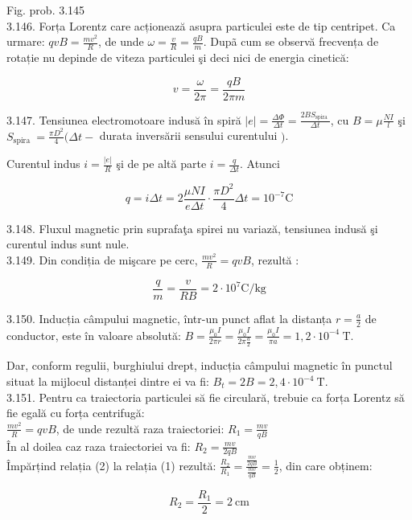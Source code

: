 \documentclass[10pt]{article}
\begin{document}
Fig. prob. 3.145\\
3.146. Forța Lorentz care acționează asupra particulei este de tip centripet. Ca urmare: $q v B=\frac{m v^{2}}{R}$, de unde $\omega=\frac{v}{R}=\frac{q B}{m}$. Dupã cum se observă frecvența de rotație nu depinde de viteza particulei şi deci nici de energia cinetică:

$$
v=\frac{\omega}{2 \pi}=\frac{q B}{2 \pi m}
$$

3.147. Tensiunea electromotoare indusă în spiră $|e|=\frac{\Delta \Phi}{\Delta t}=\frac{2 B S_{\text {spira }}}{\Delta t}$, cu $B=\mu \frac{N I}{l}$ şi $S_{\text {spira }}=\frac{\pi D^{2}}{4}(\Delta t-$ durata inversării sensului curentului $)$.

Curentul indus $i=\frac{|e|}{R}$ şi de pe altă parte $i=\frac{q}{\Delta t}$. Atunci

$$
q=i \Delta t=2 \frac{\mu N I}{e \Delta t} \cdot \frac{\pi D^{2}}{4} \Delta t=10^{-7} \mathrm{C}
$$

3.148. Fluxul magnetic prin suprafaţa spirei nu variază, tensiunea indusă şi curentul indus sunt nule.\\
3.149. Din condiția de mişcare pe cerc, $\frac{m v^{2}}{R}=q v B$, rezultă :

$$
\frac{q}{m}=\frac{v}{R B}=2 \cdot 10^{7} \mathrm{C} / \mathrm{kg}
$$

3.150. Inducția câmpului magnetic, într-un punct aflat la distanța $r=\frac{a}{2}$ de conductor, este în valoare absolută: $B=\frac{\mu_{0} I}{2 \pi r}=\frac{\mu_{0} I}{2 \pi \frac{a}{2}}=\frac{\mu_{0} I}{\pi a}=1,2 \cdot 10^{-4} \mathrm{~T}$.

Dar, conform regulii, burghiului drept, inducția câmpului magnetic în punctul situat la mijlocul distanței dintre ei va fi: $B_{t}=2 B=2,4 \cdot 10^{-4} \mathrm{~T}$.\\
3.151. Pentru ca traiectoria particulei să fie circulară, trebuie ca forța Lorentz să fie egală cu forța centrifugă:\\
$\frac{m v^{2}}{R}=q v B$, de unde rezultă raza traiectoriei: $R_{1}=\frac{m v}{q B}$\\
În al doilea caz raza traiectoriei va fi: $R_{2}=\frac{m v}{2 q B}$\\
Împărțind relația (2) la relația (1) rezultă: $\frac{R_{2}}{R_{1}}=\frac{\frac{m v}{2 q B}}{\frac{m v}{q B}}=\frac{1}{2}$, din care obținem:

$$
R_{2}=\frac{R_{1}}{2}=2 \mathrm{~cm}
$$
\end{document}
